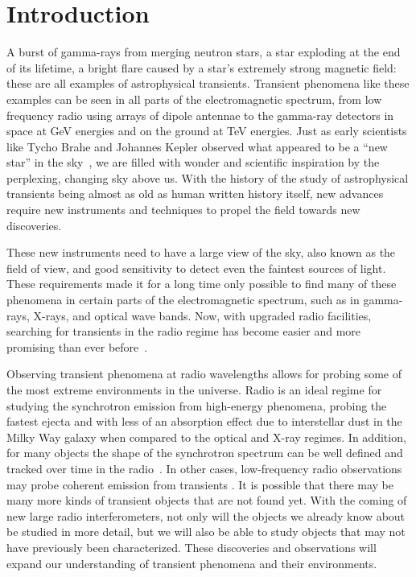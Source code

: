 \documentclass[12pt]{article}
\begin{document}
	\section{Introduction}
\label{introlabel}

A burst of gamma-rays from merging neutron stars, a star exploding at the end of its lifetime, a bright flare caused by a star's extremely strong magnetic field: these are all examples of astrophysical transients. Transient phenomena like these examples can be seen in all parts of the electromagnetic spectrum, from low frequency radio using arrays of dipole antennae to the gamma-ray detectors in space at GeV energies and on the ground at TeV energies. Just as early scientists like Tycho Brahe and Johannes Kepler observed what appeared to be a ``new star'' in the sky~\citep{1969dnen.book.....B,1606dsnip.book.....K}, we are filled with wonder and scientific inspiration by the perplexing, changing sky above us. With the history of the study of astrophysical transients being almost as old as human written history itself, new advances require new instruments and techniques to propel the field towards new discoveries. 

These new instruments need to have a large view of the sky, also known as the field of view, and good sensitivity to detect even the faintest sources of light. These requirements made it for a long time only possible to find many of these phenomena in certain parts of the electromagnetic spectrum, such as in gamma-rays, X-rays, and optical wave bands. Now, with upgraded radio facilities, searching for transients in the radio regime has become easier and more promising than ever before~\citep{2011BASI...39..315F}.

Observing transient phenomena at radio wavelengths allows for probing some of the most extreme environments in the universe. Radio is an ideal regime for studying the synchrotron emission from high-energy phenomena, probing the fastest ejecta and with less of an absorption effect due to interstellar dust in the Milky Way galaxy when compared to the optical and X-ray regimes. In addition, for many objects the shape of the synchrotron spectrum can be well defined and tracked over time in the radio~\citep[e.g.,][]{2014PASA...31....8G}. In other cases, low-frequency radio observations may probe coherent emission from transients \citep[e.g.,][]{2015MNRAS.446.3687P}. It is possible that there may be many more kinds of transient objects that are not found yet. With the coming of new large radio interferometers, not only will the objects we already know about be studied in more detail, but we will also be able to study objects that may not have previously been characterized. These discoveries and observations will expand our understanding of transient phenomena and their environments.
\end{document}
